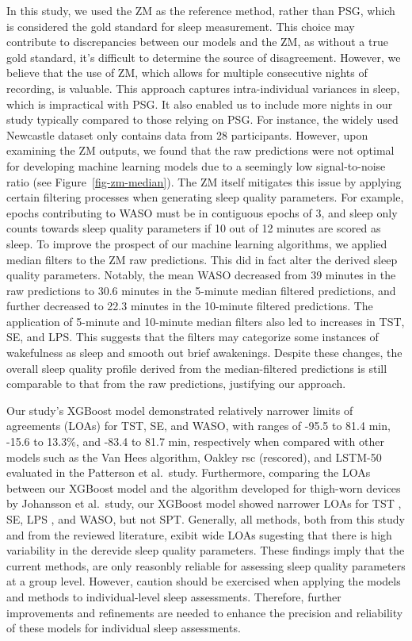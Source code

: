 \documentclass[
  super,
  preprint,
  3p]{elsarticle}
\begin{document}
In this study, we used the ZM as the reference method, rather than PSG,
which is considered the gold standard for sleep measurement. This choice
may contribute to discrepancies between our models and the ZM, as
without a true gold standard, it's difficult to determine the source of
disagreement. However, we believe that the use of ZM, which allows for
multiple consecutive nights of recording, is valuable. This approach
captures intra-individual variances in sleep, which is impractical with
PSG. It also enabled us to include more nights in our study typically
compared to those relying on PSG. For instance, the widely used
Newcastle dataset\citep{hees2015} only contains data from 28
participants. However, upon examining the ZM outputs, we found that the
raw predictions were not optimal for developing machine learning models
due to a seemingly low signal-to-noise ratio (see
Figure~\ref{fig-zm-median}). The ZM itself mitigates this issue by
applying certain filtering processes when generating sleep quality
parameters. For example, epochs contributing to WASO must be in
contiguous epochs of 3, and sleep only counts towards sleep quality
parameters if 10 out of 12 minutes are scored as sleep. To improve the
prospect of our machine learning algorithms, we applied median filters
to the ZM raw predictions. This did in fact alter the derived sleep
quality parameters. Notably, the mean WASO decreased from 39 minutes in
the raw predictions to 30.6 minutes in the 5-minute median filtered
predictions, and further decreased to 22.3 minutes in the 10-minute
filtered predictions. The application of 5-minute and 10-minute median
filters also led to increases in TST, SE, and LPS. This suggests that
the filters may categorize some instances of wakefulness as sleep and
smooth out brief awakenings. Despite these changes, the overall sleep
quality profile derived from the median-filtered predictions is still
comparable to that from the raw predictions, justifying our approach.

Our study's XGBoost model demonstrated relatively narrower limits of
agreements (LOAs) for TST, SE, and WASO, with ranges of -95.5 to 81.4
min, -15.6 to 13.3\%, and -83.4 to 81.7 min, respectively when compared
with other models such as the Van Hees algorithm\citep{hees2015}, Oakley
rsc (rescored)\citep{palotti2019}, and LSTM-50\citep{palotti2019}
evaluated in the Patterson et al.~study\citep{patterson_40_2023}.
Furthermore, comparing the LOAs between our XGBoost model and the
algorithm developed for thigh-worn devices by Johansson et
al.~study\citep{johansson2022}, our XGBoost model showed narrower LOAs
for TST , SE, LPS , and WASO, but not SPT. Generally, all methods, both
from this study and from the reviewed literature, exibit wide LOAs
sugesting that there is high variability in the derevide sleep quality
parameters. These findings imply that the current methods, are only
reasonbly reliable for assessing sleep quality parameters at a group
level. However, caution should be exercised when applying the models and
methods to individual-level sleep assessments. Therefore, further
improvements and refinements are needed to enhance the precision and
reliability of these models for individual sleep assessments.
\end{document}
